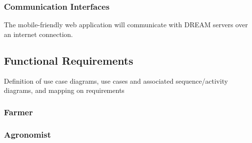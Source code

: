 \subsubsection{Communication Interfaces}
The mobile-friendly web application will communicate with DREAM servers over an internet connection. 

\subsection{Functional Requirements}
Definition of use case diagrams, use cases and associated sequence/activity diagrams, and mapping on requirements

\setcounter{usecase_counter}{1}



\subsubsection{Farmer}










\newpage
\subsubsection{Agronomist}













